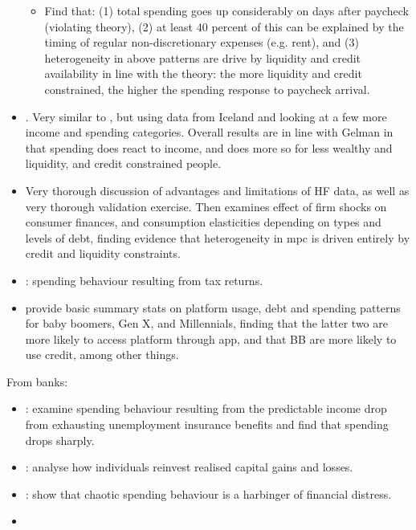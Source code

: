 \documentclass[a4paper, 11pt]{report}
\begin{document}
\begin{itemize}
\begin{itemize}
		\item Find that: (1) total spending goes up considerably on days after paycheck (violating theory), (2) at least 40 percent of this can be explained by the timing of regular non-discretionary expenses (e.g. rent), and (3) heterogeneity in above patterns are drive by liquidity and credit availability in line with the theory: the more liquidity and credit constrained, the higher the spending response to paycheck arrival.
	\end{itemize}

	\item \citet{olafsson2018liquid}. Very similar to \citet{gelman2014harnessing}, but using data from Iceland and looking at a few more income and spending categories. Overall results are in line with Gelman in that spending does react to income, and does more so for less wealthy and liquidity, and credit constrained people.

	\item \citet{baker2018debt} Very thorough discussion of advantages and limitations of HF data, as well as very thorough validation exercise. Then examines effect of firm shocks on consumer finances, and consumption elasticities depending on types and levels of debt, finding evidence that heterogeneity in mpc is driven entirely by credit and liquidity constraints.

	\item \citet{baugh2014disentangling}: spending behaviour resulting from tax returns.

	\item \citet{carlin2019generational} provide basic summary stats on platform usage, debt and spending patterns for baby boomers, Gen X, and Millennials, finding that the latter two are more likely to access platform through app, and that BB are more likely to use credit, among other things.
\end{itemize}

From banks:
\begin{itemize}
	\item \citet{ganong2019consumer}: examine spending behaviour resulting from the predictable income drop from exhausting unemployment insurance benefits and find that spending drops sharply.

	\item \citet{meyer2018fully}: analyse how individuals reinvest realised capital gains and losses.

	\item \citet{muggleton2020evidence}: show that chaotic spending behaviour is a harbinger of financial distress.

	\item

\end{itemize}
\end{document}
